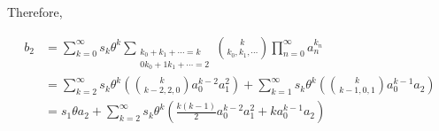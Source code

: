 Therefore,

\begin{align}
    b_2
    &= \sum_{k=0}^{\infty} s_k \theta^k \sum_{\substack{k_0 + k_1 + \cdots = k \\ 0 k_0 + 1 k_1 + \cdots = 2}} \binom{k}{k_0, k_1, \cdots} \prod_{n=0}^{\infty} a_n^{k_n} \nonumber \\
    &= \sum_{k=2}^{\infty} s_k \theta^k \left(\binom{k}{k - 2, 2, 0}a_0^{k-2} a_1^{2}\right) + \sum_{k=1}^{\infty} s_k \theta^k \left(\binom{k}{k - 1, 0, 1}a_0^{k-1} a_2\right) \nonumber \\
    &= s_1 \theta a_2 + \sum_{k=2}^{\infty} s_k \theta^k \left(\frac{k(k-1)}{2} a_0^{k-2}a_1^{2} + k a_0^{k-1}a_2\right)
\end{align}
